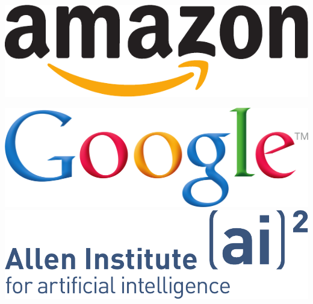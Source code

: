 \clearpage
\renewcommand{\leftheader}{Conference Sponsors}  
\renewcommand{\rightheader}{Conference Sponsors}  

\vspace*{\fill}
\noindent
\includegraphics[width=\textwidth]{logos/amazon_logo_CMYK}\\
\vspace*{\fill}

\clearpage

\vspace*{\fill}
\noindent
\includegraphics[width=\textwidth]{logos/GoogleShadedLogo_Print-crop}\\[2in]
\includegraphics[width=\textwidth]{logos/A2_Logo-crop}\\
\vspace*{\fill}

\clearpage

